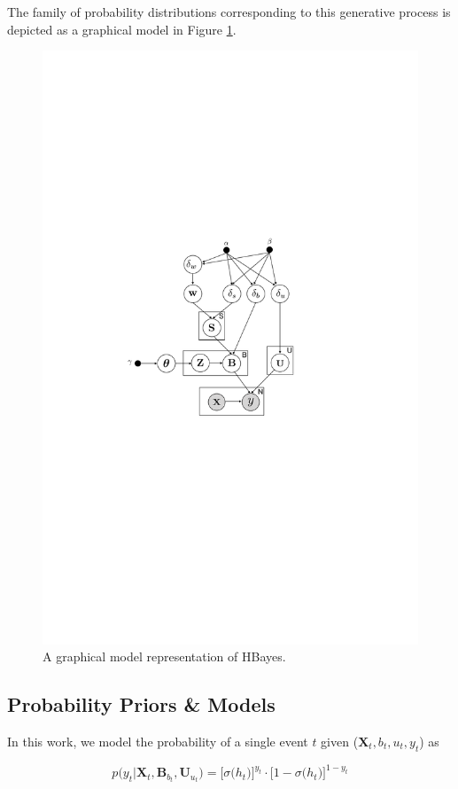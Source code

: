 The family of probability distributions corresponding to this generative process is depicted as a graphical model in Figure \ref{fig:model}.

\begin{figure}[htb]
\includegraphics[width=0.8\linewidth]{fig/model}
\caption{A graphical model representation of HBayes.}
\label{fig:model}
\end{figure}

\subsection{Probability Priors \& Models}

In this work, we model the probability of a single event $t$ given ($\mathbf{X}_t, b_t, u_t, y_t$) as 

\begin{equation}
\label{eq:sigmoid_prob}
p\big(y_t|\bm{X}_t,\bm{B}_{b_t},\bm{U}_{u_t} \big)= \Big[\sigma\big(h_t\big)\Big]^{y_t} \cdot \Big[1-\sigma\big(h_t\big)\Big]^{1-y_t}
\end{equation}

